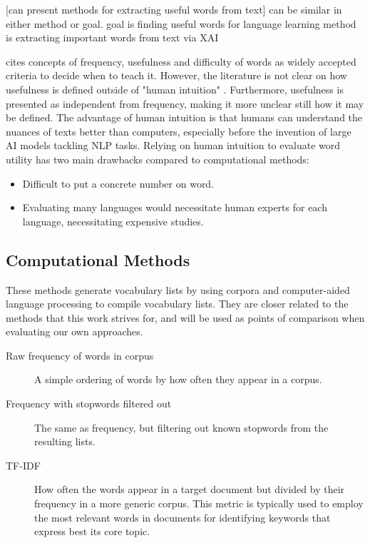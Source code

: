 [can present methods for extracting useful words from text]
can be similar in either method or goal.
goal is finding useful words for language learning
method is extracting important words from text via XAI

\cite{heChoosingWordsTeach2019} cites concepts of frequency, usefulness and difficulty of words as widely accepted criteria to decide when to teach it.
However, the literature is not clear on how usefulness is defined outside of "human intuition" \cite{heChoosingWordsTeach2019}.
Furthermore, usefulness is presented as independent from frequency, making it more unclear still how it may be defined.
The advantage of human intuition is that humans can understand the nuances of texts better than computers, especially before the invention of large AI models tackling NLP tasks.
Relying on human intuition to evaluate word utility has two main drawbacks compared to computational methods:
\begin{itemize}
	\item Difficult to put a concrete number on word.
	\item Evaluating many languages would necessitate human experts for each language, necessitating expensive studies.
\end{itemize}

\subsection{Computational Methods}
These methods generate vocabulary lists by using corpora and computer-aided language processing to compile vocabulary lists.
They are closer related to the methods that this work strives for, and will be used as points of comparison when evaluating our own approaches.

\begin{description}
	\item [Raw frequency of words in corpus]
	      A simple ordering of words by how often they appear in a corpus.
	\item [Frequency with stopwords filtered out]
	      The same as frequency, but filtering out known stopwords from the resulting lists.
	\item [TF-IDF]
	      How often the words appear in a target document but divided by their frequency in a more generic corpus.
	      This metric is typically used to employ the most relevant words in documents for identifying keywords that express best its core topic.
\end{description}

